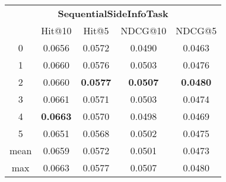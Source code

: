 \documentclass{article}
\begin{document}
 

\begin{tabular}{c|cccc}

\multicolumn{5}{c}{\textbf{SequentialSideInfoTask}} \\
\noalign{\smallskip}
\noalign{\smallskip}
\toprule
\multicolumn{1}{c}{Template ID}	&	\multicolumn{1}{|c}{Hit@10}	&	\multicolumn{1}{c}{Hit@5}	&	\multicolumn{1}{c}{NDCG@10}	&	\multicolumn{1}{c}{NDCG@5}\\
\midrule
0	&	0.0656	&	0.0572	&	0.0490	&	0.0463\\
1	&	0.0660	&	0.0576	&	0.0503	&	0.0476\\
2	&	0.0660	&	\textbf{0.0577}	&	\textbf{0.0507}	&	\textbf{0.0480}\\
3	&	0.0661	&	0.0571	&	0.0503	&	0.0474\\
4	&	\textbf{0.0663}	&	0.0570	&	0.0498	&	0.0469\\
5	&	0.0651	&	0.0568	&	0.0502	&	0.0475\\
\midrule
mean	&	0.0659	&	0.0572	&	0.0501	&	0.0473\\
max	&	0.0663	&	0.0577	&	0.0507	&	0.0480\\
\bottomrule

\end{tabular}
\end{document}
